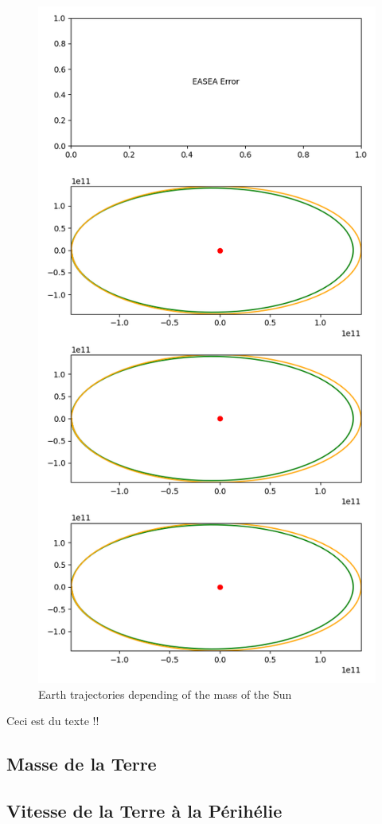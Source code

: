 \begin{figure}
    \center
    \includegraphics[width=0.5\linewidth,scale=.3]{img/sun_mass.png}
    \caption{Earth trajectories depending of the mass of the Sun}
\end{figure}
Ceci est du texte !!

\subsection{Masse de la Terre}

\subsection{Vitesse de la Terre à la Périhélie}

